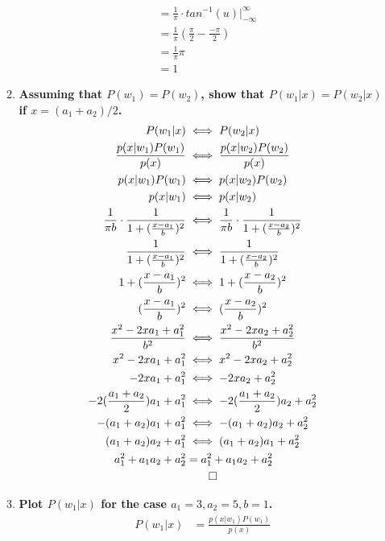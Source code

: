 \documentclass[12pt]{article}
\begin{document}
\begin{enumerate}
\begin{enumerate}
\begin{equation}
\begin{split}
      & = \frac{1}{\pi} \cdot tan^{-1}(u) |_{-\infty}^{\infty} \\
      & = \frac{1}{\pi} (\frac{\pi}{2} - \frac{-\pi}{2}) \\
      & = \frac{1}{\pi} \pi \\
      & \boxed{= 1}
    \end{split}
    \end{equation}
  \item \textbf{Assuming that $P(w_1) = P(w_2)$, show that $P(w_1|x) = P(w_2|x)$ if $x = (a_1 + a_2)/2$.}
    \begin{equation}
    \begin{split}
      P(w_1|x)& \iff P(w_2|x) \\
      \frac{p(x|w_1)P(w_1)}{p(x)}& \iff \frac{p(x|w_2)P(w_2)}{p(x)} \\
      p(x|w_1)P(w_1)& \iff p(x|w_2)P(w_2) \\
      p(x|w_1)& \iff p(x|w_2) \\
      \frac{1}{\pi b} \cdot \frac{1}{1 + (\frac{x-a_1}{b})^2}& \iff \frac{1}{\pi b} \cdot \frac{1}{1 + (\frac{x-a_2}{b})^2} \\
      \frac{1}{1 + (\frac{x-a_1}{b})^2}& \iff \frac{1}{1 + (\frac{x-a_2}{b})^2} \\
      1 + (\frac{x-a_1}{b})^2& \iff 1 + (\frac{x-a_2}{b})^2 \\
      (\frac{x-a_1}{b})^2& \iff (\frac{x-a_2}{b})^2 \\
      \frac{x^2-2xa_1+a_1^2}{b^2}& \iff \frac{x^2-2xa_2+a_2^2}{b^2} \\
      x^2-2xa_1+a_1^2& \iff x^2-2xa_2+a_2^2 \\
      -2xa_1+a_1^2& \iff -2xa_2+a_2^2 \\
      -2(\frac{a_1+a_2}{2})a_1 + a_1^2& \iff -2(\frac{a_1+a_2}{2})a_2 + a_2^2 \\
      -(a_1+a_2)a_1 + a_1^2& \iff -(a_1+a_2)a_2 + a_2^2 \\
      (a_1+a_2)a_2 + a_1^2& \iff (a_1+a_2)a_1 + a_2^2 \\
      a_1^2+ a_1a_2 + a_2^2 & = a_1^2+ a_1a_2 + a_2^2 \\
      & \qed
    \end{split}
    \end{equation}
  \item \textbf{Plot $P(w_1|x)$ for the case $a_1=3, a_2=5, b=1$.}
    \begin{equation}
    \begin{split}
      P(w_1|x)& = \frac{p(x|w_1)P(w_1)}{p(x)} \\

\end{split}
\end{equation}
\end{enumerate}
\end{enumerate}
\end{document}
